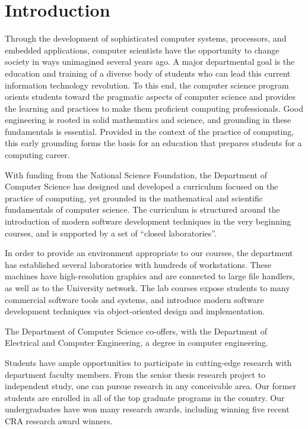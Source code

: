 \documentclass[12pt,twoside]{article}
\begin{document}

\section{Introduction}

Through the development of sophisticated computer systems, processors,
and embedded applications, computer scientists have the opportunity to
change society in ways unimagined several years ago. A major
departmental goal is the education and training of a diverse body of
students who can lead this current information technology
revolution. To this end, the computer science program orients students
toward the pragmatic aspects of computer science and provides the
learning and practices to make them proficient computing
professionals. Good engineering is rooted in solid mathematics and
science, and grounding in these fundamentals is essential. Provided in
the context of the practice of computing, this early grounding forms
the basis for an education that prepares students for a computing
career.

With funding from the National Science Foundation, the Department of
Computer Science has designed and developed a curriculum focused on
the practice of computing, yet grounded in the mathematical and
scientific fundamentals of computer science. The curriculum is
structured around the introduction of modern software development
techniques in the very beginning courses, and is supported by a
set of ``closed laboratories''.

In order to provide an environment appropriate to our courses, the
department has established several laboratories with hundreds of
workstations. These machines have high-resolution graphics and are
connected to large file handlers, as well as to the University
network. The lab courses expose students to many commercial software
tools and systems, and introduce modern software development
techniques via object-oriented design and implementation.

The Department of Computer Science co-offers, with the Department of
Electrical and Computer Engineering, a degree in computer engineering.

Students have ample opportunities to participate in cutting-edge
research with department faculty members.  From the senior thesis
research project to independent study, one can pursue research in any
conceivable area.  Our former students are enrolled in all of the top
graduate programs in the country.  Our undergraduates have won many
research awards, including winning five recent CRA research award
winners.
\end{document}
